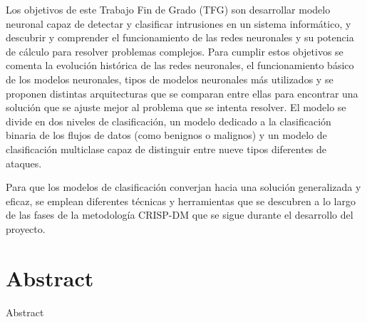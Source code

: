 \documentclass[openright,twoside,10pt]{book}
\begin{document}
Los objetivos de este Trabajo Fin de Grado (TFG) son desarrollar modelo neuronal capaz de detectar y clasificar intrusiones en un sistema informático, y descubrir y comprender el funcionamiento de las redes neuronales y su potencia de cálculo para resolver problemas complejos. Para cumplir estos objetivos se comenta la evolución histórica de las redes neuronales, el funcionamiento básico de los modelos neuronales, tipos de modelos neuronales más utilizados y se proponen distintas arquitecturas que se comparan entre ellas para encontrar una solución que se ajuste mejor al problema que se intenta resolver. El modelo se divide en dos niveles de clasificación, un modelo dedicado a la clasificación binaria de los flujos de datos (como benignos o malignos) y un modelo de clasificación multiclase capaz de distinguir entre nueve tipos diferentes de ataques.

Para que los modelos de clasificación converjan hacia una solución generalizada y eficaz, se emplean diferentes técnicas y herramientas que se descubren a lo largo de las fases de la metodología CRISP-DM que se sigue durante el desarrollo del proyecto.



\chapter*{Abstract} %
\begin{flushleft}

Abstract

\end{flushleft}

\tableofcontents %

\cleardoublepage
{} %
\listoffigures %

\cleardoublepage
{} %
\listoftables %

\clearpage

\printglossary[title=Glosario de términos, toctitle=Glosario de términos]
\glsaddall
\clearpage

\printglossary[type=\acronymtype]
\end{document}
